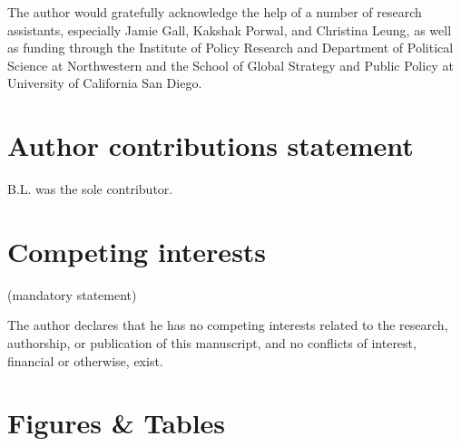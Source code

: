 \documentclass[fleqn,10pt]{wlscirep}
\begin{document}
The author would gratefully acknowledge the help of a number of research assistants, especially Jamie Gall, Kakshak Porwal, and Christina Leung, as well as funding through the Institute of Policy Research and Department of Political Science at Northwestern and the School of Global Strategy and Public Policy at University of California San Diego. 

\section*{Author contributions statement}

B.L. was the sole contributor.


\section*{Competing interests} (mandatory statement)

The author declares that he has no competing interests related to the research, authorship, or publication of this manuscript, and no conflicts of interest, financial or otherwise, exist.

\section*{Figures \& Tables}
\end{document}
